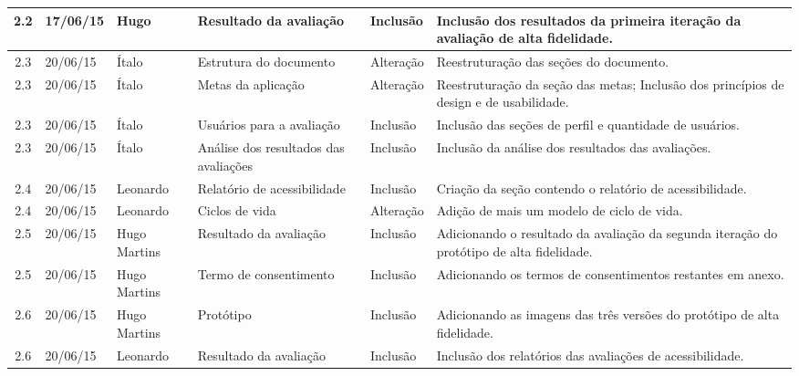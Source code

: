 \begin{longtable}{|c|m{2cm}|m{2.8cm}|m{2.3cm}|m{2.44cm}|m{4.2cm}|}
  2.2 & 17/06/15 & Hugo & Resultado da avaliação & Inclusão & Inclusão dos resultados da primeira iteração da avaliação de alta fidelidade.\\   
  \hline
  
  2.3 & 20/06/15 & Ítalo & Estrutura do documento & Alteração & Reestruturação das seções do documento.\\
  \hline
  
  2.3 & 20/06/15 & Ítalo & Metas da aplicação & Alteração & Reestruturação da seção das metas; Inclusão dos princípios de design e de usabilidade.\\
  \hline
  
  2.3 & 20/06/15 & Ítalo & Usuários para a avaliação & Inclusão &Inclusão das seções de perfil e quantidade de usuários.\\
  \hline
  
  2.3 & 20/06/15 & Ítalo & Análise dos resultados das avaliações & Inclusão & Inclusão da análise dos resultados das avaliações.\\
  \hline
  
  2.4 & 20/06/15 & Leonardo & Relatório de acessibilidade & Inclusão & Criação da seção contendo o relatório de acessibilidade.\\
  \hline
  
  2.4 & 20/06/15 & Leonardo & Ciclos de vida & Alteração & Adição de mais um modelo de ciclo de vida.\\
  \hline
  
  2.5 & 20/06/15 & Hugo Martins & Resultado da avaliação & Inclusão & Adicionando o resultado da avaliação da segunda iteração do protótipo de alta fidelidade.\\
  \hline
  
  2.5 & 20/06/15 & Hugo Martins & Termo de consentimento & Inclusão & Adicionando os termos de consentimentos restantes em anexo.\\
  \hline
  
  2.6 & 20/06/15 & Hugo Martins & Protótipo & Inclusão & Adicionando as imagens das três versões do protótipo de alta fidelidade.\\
  \hline

  2.6 & 20/06/15 & Leonardo & Resultado da avaliação & Inclusão & Inclusão dos relatórios das avaliações de acessibilidade.\\
  \hline
\end{longtable}
